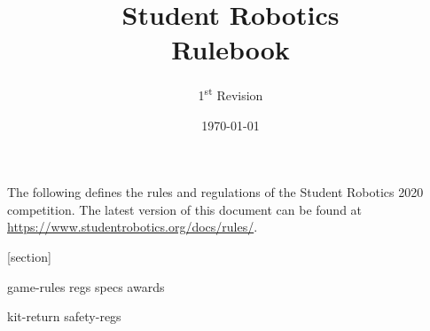 \documentclass[a4paper, 11pt]{scrartcl}
\title {Student Robotics \sryear\\ Rulebook}
\author{1\textsuperscript{st} Revision}
\date{\today}
\newcommand{\sryear}{2020}
\begin{document}
\maketitle

\noindent The following defines the rules and regulations of the Student Robotics \sryear {} competition.  The latest version of this document can be found at \url{https://www.studentrobotics.org/docs/rules/}.

[section]
\newcommand{\rcn}{\stepcounter{rule}\arabic{section}.\arabic{rule}}
\newcommand{\rcnappendix}{\stepcounter{rule}\Alph{section}.\arabic{rule}}
\renewcommand{\labelenumi}{\rcn}

 {game-rules}
\newpage
 {regs}
\newpage
 {specs}
\newpage
 {awards}

\renewcommand{\labelenumi}{\rcn}

%

\newpage
\appendix
\renewcommand{\labelenumi}{\rcnappendix}
\appendixpage
\addappheadtotoc
 {kit-return}
 {safety-regs}
\end{document}
